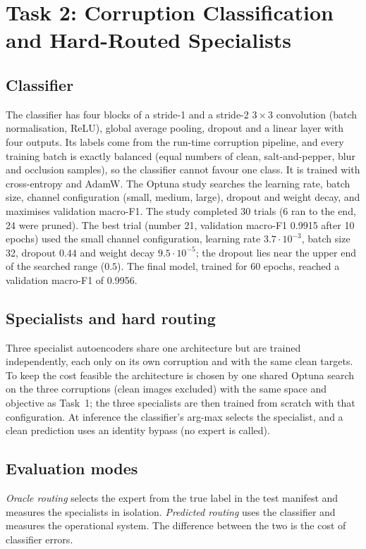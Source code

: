 \documentclass[conference]{IEEEtran}
\begin{document}
\section{Task 2: Corruption Classification and Hard-Routed Specialists}
\subsection{Classifier}
The classifier has four blocks of a stride-1 and a stride-2 $3\times3$ convolution (batch normalisation, ReLU), global average pooling, dropout and a linear layer with four outputs. Its labels come from the run-time corruption pipeline, and every training batch is exactly balanced
(equal numbers of clean, salt-and-pepper, blur and occlusion samples), so the classifier cannot favour one class. It is trained with cross-entropy and AdamW. The Optuna study searches the learning rate, batch size, channel configuration
(small, medium, large), dropout and weight decay, and maximises validation macro-F1. The study completed 30 trials (6 ran to the end, 24 were pruned). The best trial (number 21, validation macro-F1 0.9915 after 10 epochs) used the small channel configuration, learning rate $3.7\cdot10^{-3}$, batch size 32, dropout $0.44$ and weight decay $9.5\cdot10^{-5}$;
the dropout lies near the upper end of the searched range ($0.5$). The final model, trained for 60 epochs, reached a validation macro-F1 of 0.9956.

\subsection{Specialists and hard routing}
Three specialist autoencoders share one architecture but are trained independently, each only on its own corruption and with the same clean targets. To keep the cost feasible the architecture is chosen by one shared Optuna search on the three corruptions
(clean images excluded) with the same space and objective as Task~1; the three specialists are then trained from scratch with that configuration. At inference the classifier's arg-max selects the specialist, and a clean prediction uses an identity bypass
(no expert is called).

\subsection{Evaluation modes}
\emph{Oracle routing} selects the expert from the true label in the test manifest and measures the specialists in isolation. \emph{Predicted routing} uses the classifier and measures the operational system. The difference between the two is the cost of classifier errors.
\end{document}
